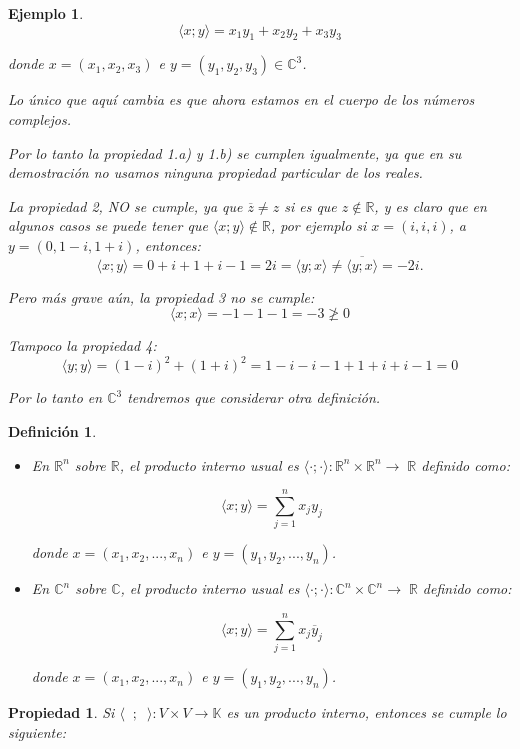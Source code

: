 \documentclass[12pt]{book}
\newtheorem{defi}{Definici\'on}
\newtheorem{prop}{Propiedad}
\newtheorem{ejem}{Ejemplo}
\def\R{\mathbb{R}}
\def\C{\mathbb{C}}
\def\K{\mathbb{K}}
\begin{document}
{\begin{ejem}
   $$\langle x;y\rangle =x_1y_1+x_2y_2+x_3y_3$$
   
donde $x=(x_1,x_2,x_3)$ e $y=(y_1,y_2,y_3)\in\C^3$.

{\em
Lo único que aquí cambia es que ahora estamos en el cuerpo de los números complejos. 

Por lo tanto la propiedad 1.a) y 1.b) se cumplen igualmente, ya que en su demostración no usamos ninguna propiedad particular de los reales.

La propiedad 2, NO se cumple, ya que $\overline{z}\not=z$ si es que $z\not\in\R$, y es claro que en algunos casos se puede tener que $\langle x;y\rangle\not \in\R$, por ejemplo si $x=(i,i,i)$, a $y=(0,1-i,1+i)$, entonces:
$$\langle x;y\rangle=0+i+1+i-1=2i=\langle y;x\rangle\not = \overline{\langle y;x\rangle}=-2i.$$

Pero más grave aún, la propiedad 3 no se cumple:
$$\langle x;x\rangle=-1-1-1=-3\not\ge0$$

Tampoco la propiedad 4:
$$\langle y;y\rangle=(1-i)^2+(1+i)^2=1-i-i-1+1+i+i-1=0$$

Por lo tanto en $\C^3$ tendremos que considerar otra definición.
}
\end{ejem}

\vspace{0.3 cm}

\begin{defi}
\begin{itemize}
\item En $\R^n$ sobre $\R$, el producto interno usual es $\langle \cdot; \cdot \rangle:\R^n\times \R^n\rightarrow\;\R$ definido como:
   
   $$\langle x;y\rangle =\displaystyle\sum_{j=1}^{n}x_jy_j$$
   
   donde $x=(x_1,x_2,...,x_n)$ e $y=(y_1,y_2,...,y_n)$.
   
\item En $\C^n$ sobre $\C$, el producto interno usual es $\langle \cdot; \cdot \rangle:\C^n\times \C^n\rightarrow\;\R$ definido como:
   
   $$\langle x;y\rangle =\displaystyle\sum_{j=1}^{n}x_j\overline{y}_j$$
   
   donde $x=(x_1,x_2,...,x_n)$ e $y=(y_1,y_2,...,y_n)$.
\end{itemize}	
\end{defi}


\vspace{0.3 cm}

\begin{prop} Si $\langle \phantom{x};\phantom{x} \rangle:V\times V\rightarrow \K$ es un producto interno, entonces se cumple lo siguiente:


\end{prop}}
\end{document}
